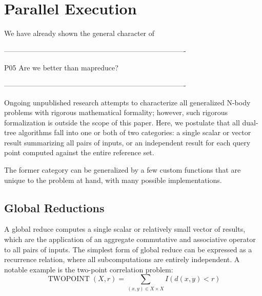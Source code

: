 \documentclass[times, 10pt,twocolumn]{article}
\DeclareMathOperator{\TWOPT}{TWOPOINT}
\begin{document}
\section{Parallel Execution}

We have already shown the general character of 



----------------------------------------------------------------------------

P05 Are we better than mapreduce?

----------------------------------------------------------------------------




Ongoing unpublished research attempts to
characterize all generalized N-body problems with rigorous mathematical
formality; however, such rigorous formalization is outside the scope of this
paper.  Here, we postulate that all dual-tree algorithms fall into one or
both of two categories: a single scalar or vector result summarizing all
pairs of inputs, or an independent result for each query point computed
against the entire reference set.

The former category can be generalized by a few custom functions that are
unique to the problem at hand, with many possible implementations.






\subsection{Global Reductions}

A global reduce computes a single scalar or relatively small vector of results, which are the application of an aggregate commutative and associative operator to all pairs of inputs.
The simplest form of global reduce can be expressed as a recurrence relation, where all subcomputations are entirely independent.
A notable example is the two-point correlation problem:
\begin{equation*}
  \TWOPT(X, r) = \sum_{(x, y) \in X \times X} I(d(x, y) < r)
\end{equation*}
\end{document}
